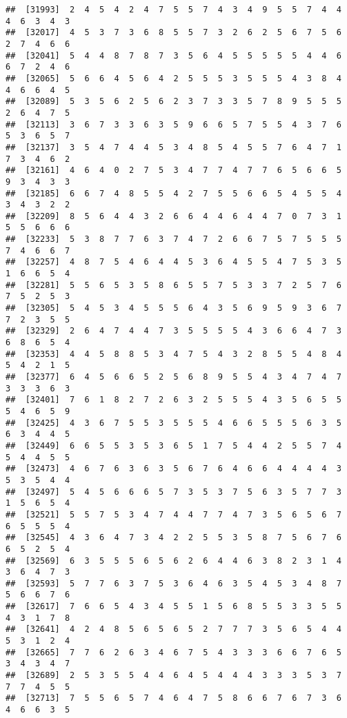 \documentclass[
]{book}
\begin{document}
\begin{verbatim}
##  [31993]  2  4  5  4  2  4  7  5  5  7  4  3  4  9  5  5  7  4  4  4  6  3  4  3
##  [32017]  4  5  3  7  3  6  8  5  5  7  3  2  6  2  5  6  7  5  6  2  7  4  6  6
##  [32041]  5  4  4  8  7  8  7  3  5  6  4  5  5  5  5  5  4  4  6  6  7  2  4  6
##  [32065]  5  6  6  4  5  6  4  2  5  5  5  3  5  5  5  4  3  8  4  4  6  6  4  5
##  [32089]  5  3  5  6  2  5  6  2  3  7  3  3  5  7  8  9  5  5  5  2  6  4  7  5
##  [32113]  3  6  7  3  3  6  3  5  9  6  6  5  7  5  5  4  3  7  6  5  3  6  5  7
##  [32137]  3  5  4  7  4  4  5  3  4  8  5  4  5  5  7  6  4  7  1  7  3  4  6  2
##  [32161]  4  6  4  0  2  7  5  3  4  7  7  4  7  7  6  5  6  6  5  9  3  4  3  3
##  [32185]  6  6  7  4  8  5  5  4  2  7  5  5  6  6  5  4  5  5  4  3  4  3  2  2
##  [32209]  8  5  6  4  4  3  2  6  6  4  4  6  4  4  7  0  7  3  1  5  5  6  6  6
##  [32233]  5  3  8  7  7  6  3  7  4  7  2  6  6  7  5  7  5  5  5  7  4  6  6  7
##  [32257]  4  8  7  5  4  6  4  4  5  3  6  4  5  5  4  7  5  3  5  1  6  6  5  4
##  [32281]  5  5  6  5  3  5  8  6  5  5  7  5  3  3  7  2  5  7  6  7  5  2  5  3
##  [32305]  5  4  5  3  4  5  5  5  6  4  3  5  6  9  5  9  3  6  7  7  2  3  5  5
##  [32329]  2  6  4  7  4  4  7  3  5  5  5  5  4  3  6  6  4  7  3  6  8  6  5  4
##  [32353]  4  4  5  8  8  5  3  4  7  5  4  3  2  8  5  5  4  8  4  5  4  2  1  5
##  [32377]  6  4  5  6  6  5  2  5  6  8  9  5  5  4  3  4  7  4  7  3  3  3  6  3
##  [32401]  7  6  1  8  2  7  2  6  3  2  5  5  5  4  3  5  6  5  5  5  4  6  5  9
##  [32425]  4  3  6  7  5  5  3  5  5  5  4  6  6  5  5  5  6  3  5  6  3  4  4  5
##  [32449]  6  6  5  5  3  5  3  6  5  1  7  5  4  4  2  5  5  7  4  5  4  4  5  5
##  [32473]  4  6  7  6  3  6  3  5  6  7  6  4  6  6  4  4  4  4  3  5  3  5  4  4
##  [32497]  5  4  5  6  6  6  5  7  3  5  3  7  5  6  3  5  7  7  3  1  5  6  5  4
##  [32521]  5  5  7  5  3  4  7  4  4  7  7  4  7  3  5  6  5  6  7  6  5  5  5  4
##  [32545]  4  3  6  4  7  3  4  2  2  5  5  3  5  8  7  5  6  7  6  6  5  2  5  4
##  [32569]  6  3  5  5  5  6  5  6  2  6  4  4  6  3  8  2  3  1  4  3  6  4  7  3
##  [32593]  5  7  7  6  3  7  5  3  6  4  6  3  5  4  5  3  4  8  7  5  6  6  7  6
##  [32617]  7  6  6  5  4  3  4  5  5  1  5  6  8  5  5  3  3  5  5  4  3  1  7  8
##  [32641]  4  2  4  8  5  6  5  6  5  2  7  7  7  3  5  6  5  4  4  5  3  1  2  4
##  [32665]  7  7  6  2  6  3  4  6  7  5  4  3  3  3  6  6  7  6  5  3  4  3  4  7
##  [32689]  2  5  3  5  5  4  4  6  4  5  4  4  4  3  3  3  5  3  7  7  7  4  5  5
##  [32713]  7  5  5  6  5  7  4  6  4  7  5  8  6  6  7  6  7  3  6  4  6  6  3  5

\end{verbatim}
\end{document}
